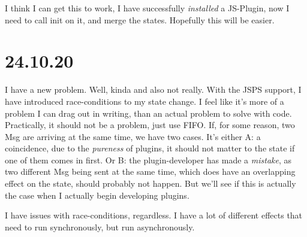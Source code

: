 I think I can get this to work, I have successfully \textit{installed} a
JS-Plugin, now I need to call init on it, and merge the states. Hopefully this
will be easier.


\section{24.10.20}

I have a new problem. Well, kinda and also not really. With the JSPS support, I
have introduced race-conditions to my state change. I feel like it's more of a
problem I can drag out in writing, than an actual problem to solve with code.
Practically, it should not be a problem, just use FIFO. If, for some reason, two
Msg are arriving at the same time, we have two cases. It's either A: a
coincidence, due to the \textit{pureness} of plugins, it should not matter to
the state if one of them comes in first. Or B: the plugin-developer has made a
\textit{mistake}, as two different Msg being sent at the same time, which does
have an overlapping effect on the state, should probably not happen.
But we'll see if this is actually the case when I actually begin developing
plugins.

I have issues with race-conditions, regardless. I have a lot of different
effects that need to run synchronously, but run asynchronously.

